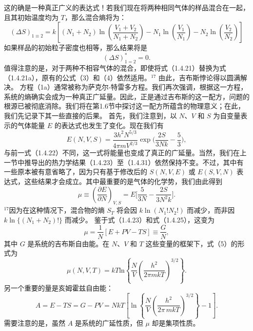 这的确是一种真正广义的表达式！若我们现在将两种相同气体的样品混合在一起，且其初始温度均为 \(T\)，那么混合熵将为：
\begin{equation}\tag{1.3.60}\label{eq:1.3.60}
( \Delta S ) _ { 1 \equiv 2 } = k \left[ ( N _ { 1 } + N _ { 2 } ) \ln \left( \frac { V _ { 1 } + V _ { 2 } } { N _ { 1 } + N _ { 2 } } \right) - N _ { 1 } \ln \left( \frac { V _ { 1 } } { N _ { 1 } } \right) - N _ { 2 } \ln \left( \frac { V _ { 2 } } { N _ { 2 } } \right) \right]
\end{equation}
如果样品的初始粒子密度也相等，那么结果将是
\begin{equation}\tag{1.3.61}\label{eq:1.3.61}
( \Delta S ) _ { 1 = 2 } ^{*} = 0 .
\end{equation}
值得注意的是，对于两种不相容气体的混合，即使将式（1.4.21）替换为式（1.4.21a），原有的公式（3）和（4）依然适用。\(^{17}\) 由此，吉布斯悖论得以圆满解决。
方程（1a）通常被称为萨克尔-特雷多方程。我们再次强调，根据这一方程，系统的熵确实会成为一种真正广延量。因此，正是通过吉布斯的这一配方，问题的根源已被彻底消除。我们将在第1.6节中探讨这一配方所蕴含的物理意义；在此，我们先记录下其一些直接的后果。
首先，我们注意到，以 \(N\)、\(V\) 和 \(S\) 为自变量表示的气体能量 \(E\) 的表达式也发生了变化。现在我们有
\begin{equation}\tag{1.3.62}\label{eq:1.3.62}
E ( N , V , S ) = \frac { 3 h ^{2} N ^{5 / 3} } { 4 \pi m V ^{2 / 3} } \exp \Bigg ( \frac { 2 S } { 3 N k } - \frac { 5 } { 3 } \Bigg ) ,
\end{equation}
与前一式（1.4.22）不同，这一式将能量也变成了真正的广延量。当然，我们在上一节中推导出的热力学结果（1.4.23）至（1.4.31）依然保持不变。不过，其中有一些原本被有意省略了，因为只有基于修改后的 \(S(N,V,E)\) 或 \(E(S,V,N)\) 表达式，这些结果才会成立。其中最重要的是气体的化学势，我们由此得到
\begin{equation}\tag{1.3.63}\label{eq:1.3.63}
\mu \equiv \left( \frac { \partial E } { \partial N } \right) _ { V , S } = E \Bigg [ \frac { 5 } { 3 N } - \frac { 2 S } { 3 N ^{2} k } \Bigg ] .
\end{equation}
\(^{17}\)因为在这种情况下，混合物的熵 \(S_{T}\) 将会因 \(k\ln(N_{1}!N_{2}!)\) 而减少，而非因 \(k\ln\{(N_{1}+N_{2})!\}\) 而减少。
鉴于式（1.4.23）和式（1.4.25），这变为
\begin{equation}\tag{1.3.64}\label{eq:1.3.64}
\mu = \frac { 1 } { N } [ E + P V - T S ] \equiv \frac { G } { N } ,
\end{equation}
其中 \(G\) 是系统的吉布斯自由能。在 \(N\)、\(V\) 和 \(T\) 这些变量的框架下，式（5）的形式为
\begin{equation}\tag{1.3.65}\label{eq:1.3.65}
\mu ( N , V , T ) = k T \mathrm { l n } \left\{ \frac { N } { V } \left( \frac { h ^{2} } { 2 \pi m k T } \right) ^{3 / 2} \right\} .
\end{equation}
另一个重要的量是亥姆霍兹自由能：
\begin{equation}\tag{1.3.66}\label{eq:1.3.66}
A = E - T S = G - P V = N k T \left[ \ln \left\{ \frac { N } { V } \left( \frac { h ^{2} } { 2 \pi \, m k T } \right) ^{3 / 2} \right\} - 1 \right] .
\end{equation}
需要注意的是，虽然 \(A\) 是系统的广延性质，但 \(\mu\) 却是集项性质。
